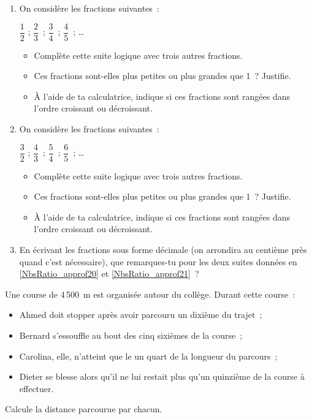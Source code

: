 \begin{exercice}
\begin{enumerate}
 \item On considère les fractions suivantes : \label{NbsRatio_approf20}
  \vspace{0.2cm} 
 \begin{center} $\dfrac{1}{2}$ ; $\dfrac{2}{3}$ ; $\dfrac{3}{4}$ ; $\dfrac{4}{5}$ ; \ldots \end{center}
 \begin{itemize}
  \item Complète cette suite logique avec trois autres fractions.
  \item Ces fractions sont-elles plus petites ou plus grandes que 1 ? Justifie.
  \item À l'aide de ta calculatrice, indique si ces fractions sont rangées dans l'ordre croissant ou décroissant.
  \end{itemize}
 \item On considère les fractions suivantes : \label{NbsRatio_approf21}
  \vspace{0.2cm} 
  \begin{center} $\dfrac{3}{2}$ ; $\dfrac{4}{3}$ ; $\dfrac{5}{4}$ ; $\dfrac{6}{5}$ ; \ldots \end{center}
 \begin{itemize}
  \item Complète cette suite logique avec trois autres fractions.
  \item Ces fractions sont-elles plus petites ou plus grandes que 1 ? Justifie.
  \item À l'aide de ta calculatrice, indique si ces fractions sont rangées dans l'ordre croissant ou décroissant.
  \end{itemize}
 \item En écrivant les fractions sous forme décimale (on arrondira au centième près quand c'est nécessaire), que remarques-tu pour les deux suites données en \ref{NbsRatio_approf20} et \ref{NbsRatio_approf21} ?
 \end{enumerate}
\end{exercice}


\begin{exercice}[La course]
Une course de 4\,500 m est organisée autour du collège. Durant cette course :
\begin{itemize}
 \item Ahmed doit stopper après avoir parcouru un dixième du trajet ;
 \item Bernard s'essouffle au bout des cinq sixièmes de la course ;
 \item Carolina, elle, n'atteint que le un quart de la longueur du parcours ;
 \item Dieter se blesse alors qu'il ne lui restait plus qu'un quinzième de la course à effectuer.
 \end{itemize}
Calcule la distance parcourue par chacun.
\end{exercice}


